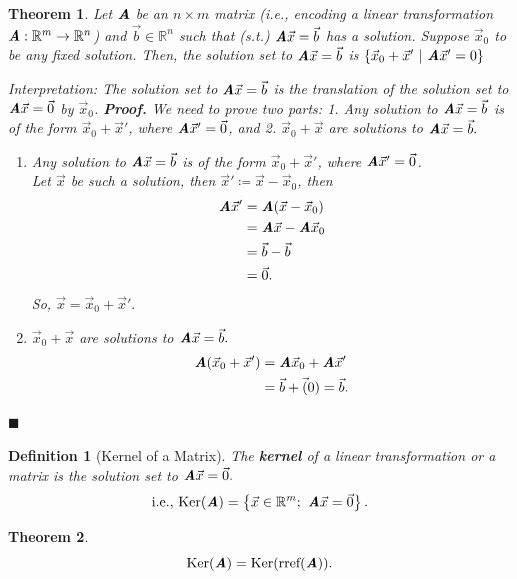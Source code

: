 \documentclass[12pt, a4paper]{article}
\newtheorem{thm}{Theorem}[subsection]
\newtheorem{df}{Definition}[subsection]
\newenvironment*{prf}{\indent\textbf{\textit{Proof. }}}{\hfill $\blacksquare$\par}
\def\R{{\mathbb{R}}}
\def\Ker{\mathrm{Ker}}
\def\vecx{\vec{x}}
\def\vecb{\vec{b}}
\def\matrixA{\textbf{\emph{A}}}
\begin{document}
\begin{thm}
	Let $\matrixA$ be an $n\times m$ matrix (i.e., encoding a linear transformation $\matrixA: \R^m\to\R^n$) and $\vecb\in\R^n$ such that (\emph{s.t.}) $\matrixA\vecx=\vecb$ has a solution. Suppose $\vecx_0$ to be any fixed solution. Then, the solution set to $\matrixA\vecx=\vecb$ is $\left\{\vecx_0+\vecx'\ |\ \matrixA\vecx'=0\right\}$
	
	Interpretation: The solution set to $\matrixA\vecx=\vecb$ is the translation of the solution set to $\matrixA\vecx=\vec{0}$ by $\vecx_0$.
	\begin{prf}
	We need to prove two parts: 1. Any solution to $\matrixA\vecx=\vecb$ is of the form $\vecx_0+\vecx'$, where $\matrixA\vecx'=\vec{0}$, and 2. $\vecx_0+\vecx$ are solutions to $\matrixA\vecx=\vecb.$
		\begin{enumerate}
			\item Any solution to $\matrixA\vecx=\vecb$ is of the form $\vecx_0+\vecx'$, where $\matrixA\vecx'=\vec{0}$.\\
			Let $\vecx$ be such a solution, then $\vecx'\coloneqq\vecx-\vecx_0$, then $$\begin{aligned}\matrixA\vecx'&=\matrixA(\vecx-\vecx_0)\\&=\matrixA\vecx-\matrixA\vecx_0\\&=\vecb-\vecb\\&=\vec{0}.\end{aligned}$$
			So, $\vecx=\vecx_0+\vecx'.$
			\item $\vecx_0+\vecx$ are solutions to $\matrixA\vecx=\vecb.$
			$$\begin{aligned}
				\matrixA(\vecx_0+\vecx')&=\matrixA\vecx_0+\matrixA\vecx'\\
				&=\vecb+\vec(0)=\vecb.
			\end{aligned}$$

		\end{enumerate}
	\end{prf}
\end{thm}
\begin{df}[Kernel of a Matrix]
	The \textbf{kernel} of a linear transformation or a matrix is the solution set to $\matrixA\vecx=\vec{0}.$
	\[\text{i.e., }\Ker(\matrixA)=\left\{\vecx\in\R^m;\  \matrixA\vecx=\vec{0}\right\}.\]
\end{df}
\begin{thm}
	\[\Ker(\matrixA)=\Ker(\text{rref}(\matrixA)).\]	
\end{thm}
\end{document}
